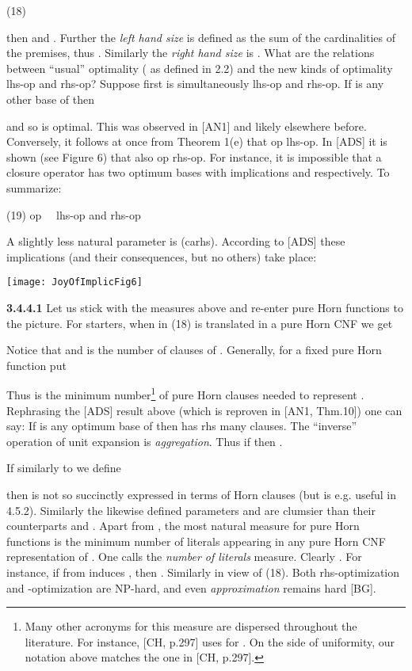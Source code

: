 \documentclass[11pt]{article}
\begin{document}
(18) \qquad 

then  and . Further the {\it left hand size} is defined as the sum of the cardinalities of the premises, thus . Similarly the {\it right hand size} is . 
What are the relations between ``usual'' optimality ( as defined in 2.2) and the new kinds of optimality lhs-op and rhs-op? Suppose first  is simultaneously lhs-op and rhs-op. If  is any other base of  then

and so  is optimal. This was observed in [AN1] and likely elsewhere before. Conversely, it follows at once from Theorem 1(e) that op  lhs-op. In [ADS] it is shown (see Figure 6) that also op  rhs-op.  For instance, it is impossible that a closure operator has two optimum bases with implications   and 
 respectively. To summarize:

(19) \qquad op \  \ lhs-op and rhs-op

A slightly less natural parameter is (carhs). According to [ADS] these implications (and their consequences, but no others) take place:

\begin{center}
\texttt{[image: JoyOfImplicFig6]}
\end{center}

{\bf 3.4.4.1} Let us stick with the measures above and re-enter pure Horn functions to the picture. For starters, when  in (18) is translated in a pure Horn CNF we get

 \qquad 

Notice that  and  is the number of clauses of . Generally, for a fixed pure Horn function  put

Thus  is the minimum number\footnote{Many other acronyms for this measure are dispersed throughout the literature. For instance, [CH, p.297] uses  for . On the side of uniformity, our notation  above matches the one in [CH, p.297].}
of pure Horn clauses needed to represent . Rephrasing the [ADS] result above (which is reproven in [AN1, Thm.10]) one can say: If  is any optimum base of  then  has rhs many clauses. The ``inverse'' operation of unit expansion is {\it aggregation}. Thus if  then . 

If similarly to  we define

then  is not so succinctly expressed in terms of Horn clauses (but is e.g. useful in 4.5.2). Similarly the likewise defined parameters  and  are clumsier than their counterparts  and . Apart from   , the most natural measure for pure Horn functions is the minimum number  of literals appearing in any pure Horn CNF representation of . One calls  the {\it number of literals} measure. Clearly . For instance, if  from  induces , then . Similarly  in view of (18).
Both rhs-optimization and -optimization are NP-hard, and even {\it approximation} remains hard [BG].
\end{document}
